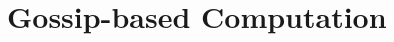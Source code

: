 \ifx\allfiles\undefined


	\else
	\fi
	\chapter{Gossip-based Computation}
	
	

\ifx\allfiles\undefined

\fi